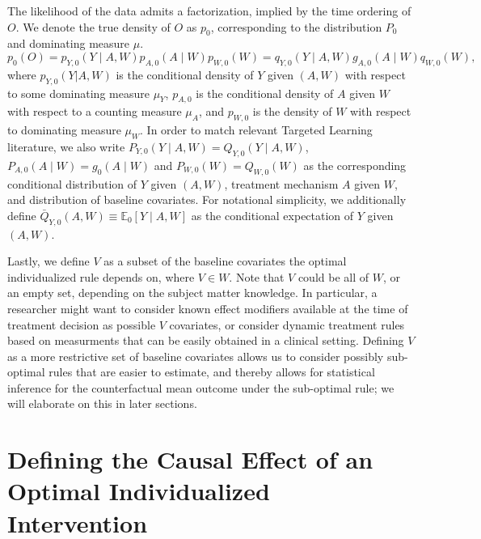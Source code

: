 \documentclass[
  12pt, krantz2,
]{krantz}
\newcommand{\E}{\mathbb{E}}
\newcommand{\1}{\mathbbm{1}}
\theoremstyle{definition}
\theoremstyle{definition}
\theoremstyle{definition}
\theoremstyle{definition}
\theoremstyle{remark}
\begin{document}
The likelihood of the data admits a factorization, implied by the time ordering
of \(O\). We denote the true density of \(O\) as \(p_0\), corresponding to the
distribution \(P_0\) and dominating measure \(\mu\).
\begin{equation}
  p_0(O) = p_{Y,0}(Y \mid A,W) p_{A,0}(A \mid W) p_{W,0}(W) =
    q_{Y,0}(Y \mid A,W) g_{A,0}(A \mid W) q_{W,0}(W),
  \label{eq:likelihood-factorization-mopttx}
\end{equation}
where \(p_{Y,0}(Y|A,W)\) is the conditional density of \(Y\) given \((A, W)\) with
respect to some dominating measure \(\mu_Y\), \(p_{A,0}\) is the conditional density
of \(A\) given \(W\) with respect to a counting measure \(\mu_A\), and \(p_{W,0}\) is
the density of \(W\) with respect to dominating measure \(\mu_W\). In order to
match relevant Targeted Learning literature, we also
write \(P_{Y,0}(Y \mid A, W) = Q_{Y,0}(Y \mid A,W)\), \(P_{A,0}(A \mid W) = g_0(A \mid W)\)
and \(P_{W,0}(W)=Q_{W,0}(W)\) as the corresponding conditional
distribution of \(Y\) given \((A,W)\), treatment mechanism \(A\) given \(W\), and
distribution of baseline covariates. For notational simplicity, we additionally define
\(\bar{Q}_{Y,0}(A,W) \equiv \E_0[Y \mid A,W]\) as the conditional expectation of
\(Y\) given \((A,W)\).

Lastly, we define \(V\) as a subset of the baseline covariates the optimal
individualized rule depends on, where \(V \in W\). Note that \(V\) could be all of
\(W\), or an empty set, depending on the subject matter knowledge. In particular,
a researcher might want to consider known effect modifiers available at the time
of treatment decision as possible \(V\) covariates, or consider dynamic treatment
rules based on measurments that can be easily obtained in a clinical setting.
Defining \(V\) as a more restrictive set of baseline covariates allows us to consider
possibly sub-optimal rules that are easier to estimate, and thereby allows for
statistical inference for the counterfactual mean outcome under the sub-optimal rule;
we will elaborate on this in later sections.

\hypertarget{defining-the-causal-effect-of-an-optimal-individualized-intervention}{%
\section{Defining the Causal Effect of an Optimal Individualized Intervention}\label{defining-the-causal-effect-of-an-optimal-individualized-intervention}}
\end{document}
